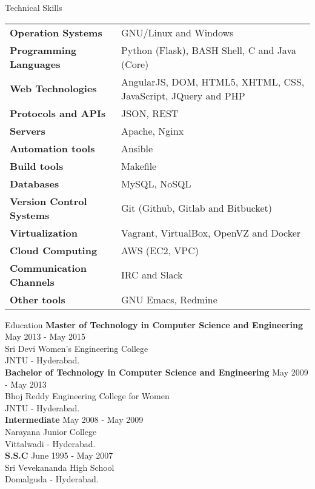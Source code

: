 \documentclass{resume} %
\begin{document}
\begin{rSection}
  {Technical Skills}

  \begin{tabular}{ @{} >{\bfseries}l @{\hspace{2ex}} l }
    Operation Systems & GNU/Linux and Windows \\
    Programming Languages & Python (Flask), BASH Shell, C and Java (Core)
    \\ Web Technologies & AngularJS, DOM, HTML5, XHTML, CSS,
    JavaScript, JQuery and PHP \\ Protocols and
    APIs & JSON, REST \\ Servers
    & Apache, Nginx \\ Automation tools & Ansible \\
    Build tools &  Makefile
    \\ Databases & MySQL, NoSQL \\ Version Control Systems & Git (Github, Gitlab and
    Bitbucket) \\ Virtualization & Vagrant, VirtualBox, 
    OpenVZ and Docker \\ Cloud Computing & AWS (EC2, VPC) \\ Communication
    Channels & IRC and Slack  \\ Other tools & GNU Emacs, Redmine 
    
  \end{tabular}

\end{rSection}



\begin{rSection}{Education}
  {\bf Master of Technology in Computer Science and Engineering} \hfill {May 2013 - May 2015}
  \\ 
  Sri Devi Women's Engineering College 
  \\
  JNTU - Hyderabad.
  \\
  {\bf Bachelor of Technology in Computer Science and Engineering} \hfill {May 2009 - May 2013}
  \\ 
  Bhoj Reddy Engineering College for Women
  \\
  JNTU - Hyderabad.
  \\
  {\bf Intermediate} \hfill {May 2008 - May 2009}
  \\ 
  Narayana Junior College
  \\
  Vittalwadi - Hyderabad.
  \\
  {\bf S.S.C} \hfill {June 1995 - May 2007}
  \\ 
  Sri Vevekananda High School
  \\
  Domalguda - Hyderabad.

\end{rSection}
\end{document}
